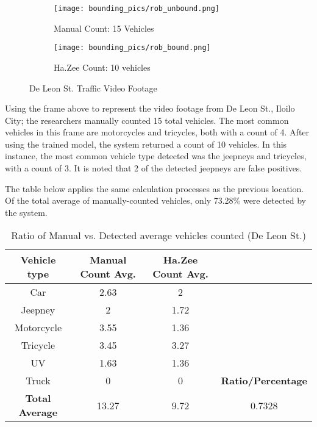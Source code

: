 \begin{figure}
	\begin{subfigure}{.5\textwidth}
		\centering
		\texttt{[image: bounding\_pics/rob\_unbound.png]}
		\caption{Manual Count: 15 Vehicles}
		
	\end{subfigure}%
	\begin{subfigure}{.5\textwidth}
		\centering
		\texttt{[image: bounding\_pics/rob\_bound.png]}
		\caption{Ha.Zee Count: 10 vehicles}
	\end{subfigure}
	\caption{De Leon St. Traffic Video Footage}
\end{figure}

Using the frame above to represent the video footage from De Leon St., Iloilo City; the researchers manually counted 15 total vehicles. The most common vehicles in this frame are motorcycles and tricycles, both with a count of 4. After using the trained model, the system returned a count of 10 vehicles. In this instance, the most common vehicle type detected was the jeepneys and tricycles, with a count of 3. It is noted that 2 of the detected jeepneys are false positives.

The table below applies the same calculation processes as the previous location. Of the total average of manually-counted vehicles, only 73.28\% were detected by the system. 



\begin{table}[ht]   %
	\centering
	\caption{Ratio of Manual vs. Detected average vehicles counted  (De Leon St.)} \vspace{0.25em}
	\begin{tabular}{|c|c|c|c|} \hline
		\centering \textbf {Vehicle type} & Manual Count Avg. & Ha.Zee Count Avg.	&  \\ \hline
		Car & 2.63 & 2  &   \\ \hline
		Jeepney & 2 & 1.72  &	\\ \hline
		Motorcycle& 3.55  & 1.36  & \\ \hline
		Tricycle   & 3.45  & 3.27 & \\ \hline
		UV & 1.63 & 1.36 & \\ \hline
		Truck & 0 & 0 & \textbf{Ratio/Percentage}\\ \hline
		
		\textbf{Total Average} &13.27 & 9.72 & 0.7328 \\ \hline
		
	\end{tabular}
	\label{tab:de_leon}
\end{table}

